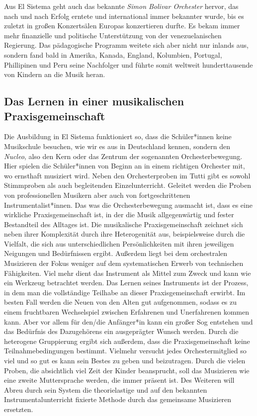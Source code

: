 Aus El Sistema geht auch das bekannte \emph{Simon Bolivar Orchester} hervor, das
nach und nach Erfolg erntete und international immer bekannter wurde, bis es
zuletzt in großen Konzertsälen Europas konzertieren durfte. Es bekam immer mehr
finanzielle und politische Unterstützung von der venezuelanischen Regierung. Das
pädagogische Programm weitete sich aber nicht nur inlands aus, sondern fand bald
in Amerika, Kanada, England, Kolumbien, Portugal, Phillipinen und Peru seine
Nachfolger und führte somit weltweit hunderttausende von Kindern an die Musik
heran. 

\subsection{Das Lernen in einer musikalischen Praxisgemeinschaft}
Die Ausbildung in El Sistema funktioniert so, dass die Schüler*innen keine
Musikschule besuchen, wie wir es aus in Deutschland kennen, sondern den
\emph{Nucleo}, also den Kern oder das Zentrum der sogenannten Orchesterbewegung.
Hier spielen die Schüler*innen von Beginn an in einem richtigen Orchester mit,
wo ernsthaft musiziert wird. Neben den Orchesterproben im Tutti gibt es sowohl
Stimmproben als auch begleitenden Einzelunterricht. Geleitet werden die Proben
von professionellen Musikern aber auch von fortgeschrittenen
Instrumentalist*innen.
\autocite[45]{kaufmann:el_sistema} 
Das was die Orchesterbewegung ausmacht ist, dass es eine wirkliche
Praxisgemeinschaft ist, in der die Musik allgegenwärtig und fester Bestandteil
des Alltages ist. Die musikalische Praxisgemeinschaft zeichnet sich neben
ihrer Komplexität durch ihre Heterogenität aus, beispielsweise durch die Vielfalt, die sich aus
unterschiedlichen Persönlichkeiten mit ihren jeweiligen Neigungen und
Bedürfnissen ergibt. \autocite[161]{roebke_mantilla:vom_wilden_lernen} Außerdem
liegt bei dem orchestralen Musizieren der Fokus weniger auf dem systematischen
Erwerb von technischen Fähigkeiten. Viel mehr dient das Instrument als Mittel
zum Zweck und kann wie ein Werkzeug betrachtet werden. Das Lernen seines Instruments ist der Prozess,
in dem man die vollständige Teilhabe an dieser Praxisgemeinschaft erwirbt. Im
besten Fall werden die Neuen von den Alten gut aufgenommen, sodass es zu einem
fruchtbaren Wechselspiel zwischen Erfahrenen und Unerfahrenen kommen kann. Aber
vor allem für den/die Anfänger*in kann ein großer Sog entstehen und das
Bedürfnis des Dazugehörens ein ausgeprägter Wunsch werden. Durch die heterogene
Gruppierung ergibt sich außerdem, dass die Praxisgemeinschaft keine
Teilnahmebedingungen bestimmt. Vielmehr versucht jedes Orchestermitglied so viel
und so gut es kann sein Bestes zu geben und beizutragen. Durch die vielen
Proben, die absichtlich viel Zeit der Kinder beansprucht, soll das Musizieren
wie eine zweite Muttersprache werden, die immer präsent ist.
\autocite[162]{kaufmann:el_sistema} Des Weiteren will Abreu durch sein System
die theorielastige und auf den bekannten Instrumentalunterricht fixierte Methode
durch das gemeinsame Musizieren ersetzten. 
\autocite[45]{kaufmann:el_sistema}




